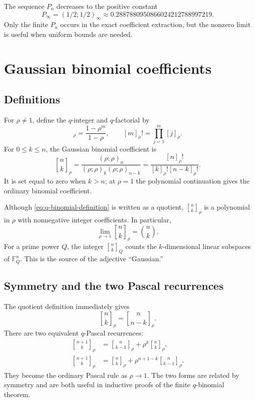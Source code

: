 \documentclass[11pt]{article}
\theoremstyle{definition}
\newcommand{\qpoch}[3]{\left(#1;#2\right)_{#3}}
\newcommand{\Qbin}[3]{\genfrac{[}{]}{0pt}{}{#1}{#2}_{#3}}
\begin{document}
The sequence $P_n$ decreases to the positive constant
\begin{equation}
  P_\infty=\qpoch{1/2}{1/2}{\infty}
  \approx 0.2887880950866024212788997219.
  \label{eq:P-infinity}
\end{equation}
Only the finite $P_n$ occurs in the exact coefficient extraction, but the nonzero limit is useful when uniform bounds are needed.

\section{Gaussian binomial coefficients}
\label{sec:gaussian}

\subsection{Definitions}

For $\rho\ne1$, define the $q$-integer and $q$-factorial by
\begin{equation}
  [m]_\rho=\frac{1-\rho^m}{1-\rho},
  \qquad
  [m]_\rho!=\prod_{j=1}^{m}[j]_\rho.
  \label{eq:q-factorial}
\end{equation}
For $0\le k\le n$, the Gaussian binomial coefficient is
\begin{equation}
  \Qbin{n}{k}{\rho}
  =\frac{\qpoch{\rho}{\rho}{n}}
         {\qpoch{\rho}{\rho}{k}\qpoch{\rho}{\rho}{n-k}}
  =\frac{[n]_\rho!}{[k]_\rho![n-k]_\rho!}.
  \label{eq:q-binomial-definition}
\end{equation}
It is set equal to zero when $k>n$; at $\rho=1$ the polynomial continuation gives the ordinary binomial coefficient.

Although \cref{eq:q-binomial-definition} is written as a quotient, $\Qbin{n}{k}{\rho}$ is a polynomial in $\rho$ with nonnegative integer coefficients.  In particular,
\begin{equation}
  \lim_{\rho\to1}\Qbin{n}{k}{\rho}=\binom{n}{k}.
  \label{eq:q-to-one}
\end{equation}
For a prime power $Q$, the integer $\Qbin{n}{k}{Q}$ counts the $k$-dimensional linear subspaces of $\mathbb F_Q^n$.  This is the source of the adjective ``Gaussian.''

\subsection{Symmetry and the two Pascal recurrences}

The quotient definition immediately gives
\begin{equation}
  \Qbin{n}{k}{\rho}=\Qbin{n}{n-k}{\rho}.
  \label{eq:q-binomial-symmetry}
\end{equation}
There are two equivalent $q$-Pascal recurrences:
\begin{align}
  \Qbin{n+1}{k}{\rho}
  &=\Qbin{n}{k-1}{\rho}+\rho^k\Qbin{n}{k}{\rho},
  \label{eq:q-pascal-one}\\
  \Qbin{n+1}{k}{\rho}
  &=\Qbin{n}{k}{\rho}+\rho^{n+1-k}\Qbin{n}{k-1}{\rho}.
  \label{eq:q-pascal-two}
\end{align}
They become the ordinary Pascal rule as $\rho\to1$.  The two forms are related by symmetry and are both useful in inductive proofs of the finite $q$-binomial theorem.
\end{document}
